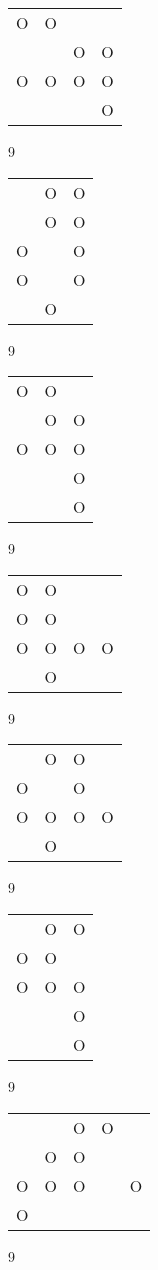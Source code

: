 \begin{tabular}{|m{0.2cm}m{0.2cm}m{0.2cm}m{0.2cm}|}\hline
O&O& & \\
 & &O&O\\
O&O&O&O\\
 & & &O\\
\hline\end{tabular}9
\begin{tabular}{|m{0.2cm}m{0.2cm}m{0.2cm}|}\hline
 &O&O\\
 &O&O\\
O& &O\\
O& &O\\
 &O& \\
\hline\end{tabular}9
\begin{tabular}{|m{0.2cm}m{0.2cm}m{0.2cm}|}\hline
O&O& \\
 &O&O\\
O&O&O\\
 & &O\\
 & &O\\
\hline\end{tabular}9
\begin{tabular}{|m{0.2cm}m{0.2cm}m{0.2cm}m{0.2cm}|}\hline
O&O& & \\
O&O& & \\
O&O&O&O\\
 &O& & \\
\hline\end{tabular}9
\begin{tabular}{|m{0.2cm}m{0.2cm}m{0.2cm}m{0.2cm}|}\hline
 &O&O& \\
O& &O& \\
O&O&O&O\\
 &O& & \\
\hline\end{tabular}9
\begin{tabular}{|m{0.2cm}m{0.2cm}m{0.2cm}|}\hline
 &O&O\\
O&O& \\
O&O&O\\
 & &O\\
 & &O\\
\hline\end{tabular}9
\begin{tabular}{|m{0.2cm}m{0.2cm}m{0.2cm}m{0.2cm}m{0.2cm}|}\hline
 & &O&O& \\
 &O&O& & \\
O&O&O& &O\\
O& & & & \\
\hline\end{tabular}9
